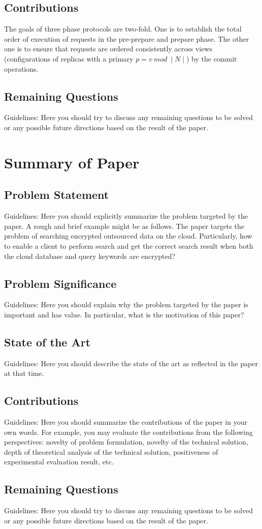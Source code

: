 \documentclass[conference]{IEEEtran}
\begin{document}
\subsection{Contributions}
The goals of three phase protocols are two-fold.
%
One is to establish the total order of execution of requests in the pre-prepare and prepare phase.
%
The other one is to ensure that requests are ordered consistently across views (configurations of replicas with a primary $p = v\ mod\ {\mid} N \mid$) by the commit operations.

\subsection{Remaining Questions}
Guidelines: Here you should try to discuss any remaining questions to be solved or any possible future directions based on the result of the paper.

\section{Summary of Paper \cite{CurtmolaGKO06}}

\subsection{Problem Statement}
Guidelines: Here you should explicitly summarize the problem targeted by the paper. A rough and brief example might be as follows.
%
The paper targets the problem of searching encrypted outsourced data on the cloud.
%
Particularly, how to enable a client to perform search and get the correct search result when both the cloud database and query keywords are encrypted?

\subsection{Problem Significance}
Guidelines: Here you should explain why the problem targeted by the paper is important and has value.
%
In particular, what is the motivation of this paper?


\subsection{State of the Art}

Guidelines: Here you should describe the state of the art as reflected in the paper at that time.
%



\subsection{Contributions}
Guidelines: Here you should summarize the contributions of the paper in your own words.
%
For example, you may evaluate the contributions from the following perspectives: novelty of problem formulation, novelty of the technical solution, depth of theoretical analysis of the technical solution, positiveness of experimental evaluation result, etc.

\subsection{Remaining Questions}
Guidelines: Here you should try to discuss any remaining questions to be solved or any possible future directions based on the result of the paper.



\end{document}
